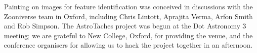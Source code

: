 \documentclass[useAMS,usenatbib]{mn2e}
\begin{document}
Painting on images for feature identification 
was conceived in discussions with the Zooniverse team in Oxford,
including Chris Lintott, Aprajita Verma, Arfon Smith and Rob Simpson. The
AstroTaches project was begun at the Dot Astronomy 3 meeting; we are grateful
to New College, Oxford, for providing the venue, and the conference organisers
for allowing us to hack the project together in an afternoon. 
%

\label{lastpage}

% 





\bsp
\end{document}
